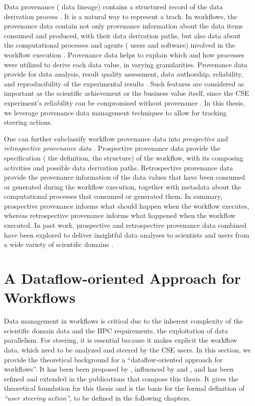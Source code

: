 Data provenance (\ie{} data lineage) contains a structured record of the data derivation process \cite{herschel_survey_2017}. It is a natural way to represent a track. In workflows, the provenance data contain not only provenance information about the data items consumed and produced, with their data derivation paths, but also data about the computational processes and agents (\eg{} users and software) involved in the workflow execution \cite{Costa2013Capturing}.
Provenance data helps to explain which and how processes were utilized to derive
each data value, in varying granularities.
Provenance data provide for data analysis,
result quality assessment, data authorship, reliability, and reproducibility of the experimental results \cite{Freire2008Provenance,Davidson2008Provenance,herschel_survey_2017}.
Such
features are considered as important as the scientific achievement or the business value
itself, since the CSE experiment's reliability can be compromised without provenance
\cite{Freire2008Provenance}. In this thesis, we leverage provenance
data management techniques to allow for tracking steering actions.

One can further subclassify workflow provenance data into \textit{prospective} and \textit{retrospective provenance data} \cite{herschel_survey_2017,Freire2008Provenance}.
Prospective provenance data provide the specification (\ie{} the definition, the structure) of the workflow, with its composing activities and possible data derivation paths.
Retrospective provenance data provide the provenance information of the data values that have been consumed or generated during the workflow execution, together with metadata about the computational processes that consumed or generated them.
In summary, prospective provenance informs what should happen when the workflow executes, whereas retrospective provenance informs what  happened when the workflow executed.
In past work, prospective and retrospective provenance data combined have been explored to deliver insightful data analyses to scientists
and users from a wide variety of scientific domains \cite{DeOliveira2015How,Souza2015Monitoramento,Silva2017Raw,Souza2017Data,silva_adding_2018,barbosa2016applying}.


\section{A Dataflow-oriented Approach for Workflows} \label{subsec_datacentric}

Data management in workflows is critical due to the inherent complexity of
the scientific domain data and the HPC requirements, \eg{}
the exploitation of data parallelism.
For steering, it is essential because it makes explicit the workflow data, which need to be analyzed and steered by the CSE users.
In this section, we provide the theoretical background for a ``dataflow-oriented approach for workflows''.
It has been been proposed by \citet{Silva2017Raw}, influenced by \citet{Ikeda2013Logical} and \citet{Ogasawara2011algebraic},
and has been refined and extended in the publications that compose this thesis.
It gives the theoretical foundation for this thesis and is the basis for the formal definition of \textit{``user steering action''}, to be defined in the following chapters.


